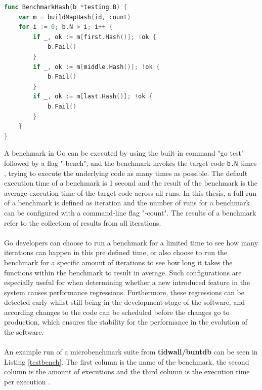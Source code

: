 \documentclass{seal_thesis}
\begin{document}
\begin{lstlisting}[caption=An example benchmark from ironsmile/nedomi \cite{ironsmile/nedomi}., label={BenchmarkSrc}, language=Go, frame=single, breaklines=false]
func BenchmarkHash(b *testing.B) {
	var m = buildMapHash(id, count)
	for i := 0; b.N > i; i++ {
		if _, ok := m[first.Hash()]; !ok {
			b.Fail()
		}
		if _, ok := m[middle.Hash()]; !ok {
			b.Fail()
		}
		if _, ok := m[last.Hash()]; !ok {
			b.Fail()
		}
	}
}
\end{lstlisting}

\noindent A benchmark in Go can be executed by using the built-in command "go test" followed by a flag "-bench", and the benchmark invokes the target code \texttt{b.N} times \cite{gobench}, trying to execute the underlying code as many times as possible. The default execution time of a benchmark is 1 second and the result of the benchmark is the average execution time of the target code across all runs. In this thesis, a full run of a benchmark is defined as iteration and the number of runs for a benchmark can be configured with a command-line flag "-count". The results of a benchmark refer to the collection of results from all iterations.\\
\\
Go developers can choose to run a benchmark for a limited time to see how many iterations can happen in this pre defined time, or also choose to run the benchmark for a specific amount of iterations to see how long it takes the functions within the benchmark to result in average. Such configurations are especially useful for when determining whether a new introduced feature in the system causes performance regressions. Furthermore, these regressions can be detected early whilst still being in the development stage of the software, and according changes to the code can be scheduled before the changes go to production, which ensures the stability for the performance in the evolution of the software.\\
\\
An example run of a microbenchmark suite from \textbf{tidwall/buntdb} \cite{tidwall/buntdb} can be seen in Listing \ref{testbench}. The first column is the name of the benchmark, the second column is the amount of executions and the third column is the execution time per execution \cite{gobench}.
\clearpage
\end{document}
